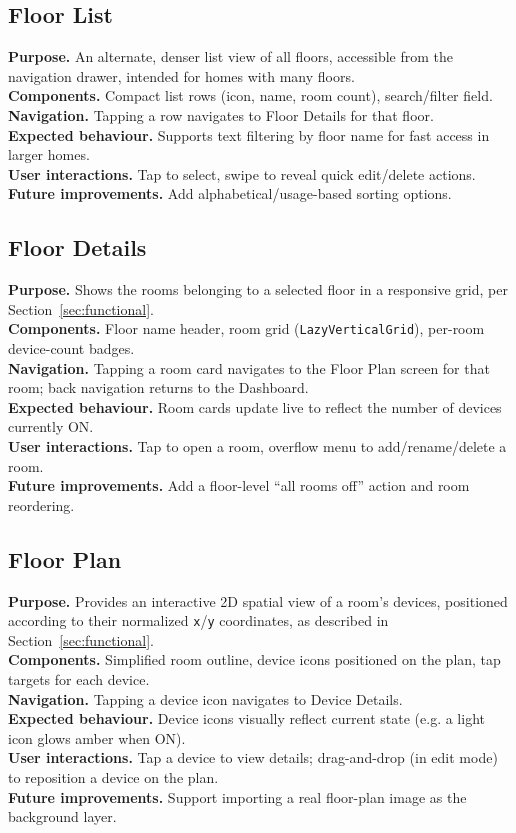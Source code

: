 \documentclass[11pt,a4paper]{article}
\begin{document}
\subsection{Floor List}
\textbf{Purpose.} An alternate, denser list view of all floors, accessible from the navigation drawer, intended for homes with many floors.\\
\textbf{Components.} Compact list rows (icon, name, room count), search/filter field.\\
\textbf{Navigation.} Tapping a row navigates to Floor Details for that floor.\\
\textbf{Expected behaviour.} Supports text filtering by floor name for fast access in larger homes.\\
\textbf{User interactions.} Tap to select, swipe to reveal quick edit/delete actions.\\
\textbf{Future improvements.} Add alphabetical/usage-based sorting options.

\subsection{Floor Details}
\textbf{Purpose.} Shows the rooms belonging to a selected floor in a responsive grid, per Section~\ref{sec:functional}.\\
\textbf{Components.} Floor name header, room grid (\texttt{LazyVerticalGrid}), per-room device-count badges.\\
\textbf{Navigation.} Tapping a room card navigates to the Floor Plan screen for that room; back navigation returns to the Dashboard.\\
\textbf{Expected behaviour.} Room cards update live to reflect the number of devices currently ON.\\
\textbf{User interactions.} Tap to open a room, overflow menu to add/rename/delete a room.\\
\textbf{Future improvements.} Add a floor-level ``all rooms off'' action and room reordering.

\subsection{Floor Plan}
\textbf{Purpose.} Provides an interactive 2D spatial view of a room's devices, positioned according to their normalized \texttt{x}/\texttt{y} coordinates, as described in Section~\ref{sec:functional}.\\
\textbf{Components.} Simplified room outline, device icons positioned on the plan, tap targets for each device.\\
\textbf{Navigation.} Tapping a device icon navigates to Device Details.\\
\textbf{Expected behaviour.} Device icons visually reflect current state (e.g. a light icon glows amber when ON).\\
\textbf{User interactions.} Tap a device to view details; drag-and-drop (in edit mode) to reposition a device on the plan.\\
\textbf{Future improvements.} Support importing a real floor-plan image as the background layer.
\end{document}
